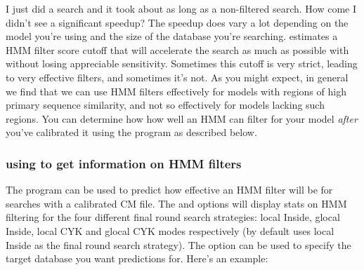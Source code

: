 \begin{srefaq}{I just did a search and it took about as long as a
    non-filtered search. How come I didn't see a significant speedup?}
  The speedup does vary a lot depending on the model you're using and
  the size of the database you're searching. 
  estimates a HMM filter score cutoff that will accelerate the search
  as much as possible with without losing appreciable
  sensitivity. Sometimes this cutoff is very strict, leading to very
  effective filters, and sometimes it's not. As you might expect, in
  general we find that we can use HMM filters effectively for models
  with regions of high primary sequence similarity, and not so
  effectively for models lacking such regions. You can determine how
  how well an HMM can filter for your model \emph{after} you've
  calibrated it using the  program as described below.
\end{srefaq}


\subsubsection{using  to get information on HMM filters}

The  program can be used to predict how effective an
HMM filter will be for searches with a calibrated CM file. The
 and  options will display stats on
HMM filtering for the four different final round search strategies:
local Inside, glocal Inside, local CYK and glocal CYK modes
respectively (by default  uses local Inside as the
final round search strategy). The  option can be
used to specify the target database you want predictions for. 
Here's an example:


